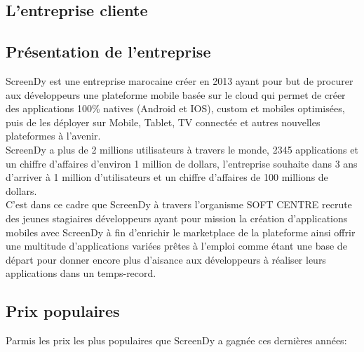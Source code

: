 \documentclass[12pt,a4paper]{report}
\begin{document}
	\subsection{L'entreprise cliente}
		\subsection{Présentation de l'entreprise}
ScreenDy est une entreprise marocaine créer en 2013 ayant pour but de procurer aux développeurs une plateforme mobile basée sur le cloud qui permet de créer des applications 100\% natives (Android et IOS), custom et mobiles optimisées, puis de les déployer sur Mobile, Tablet, TV connectée et autres nouvelles plateformes à l'avenir.\\
ScreenDy a plus de 2 millions utilisateurs à travers le monde, 2345 applications et un chiffre d'affaires d'environ 1 million de dollars, l'entreprise souhaite dans 3 ans d'arriver à 1 million d'utilisateurs et un chiffre d'affaires de 100 millions de dollars.\\
C'est dans ce cadre que ScreenDy à travers l'organisme SOFT CENTRE recrute des jeunes stagiaires développeurs ayant pour mission la création d'applications mobiles avec ScreenDy à fin d'enrichir le \guillemotleft marketplace \guillemotright de la plateforme ainsi offrir une multitude d'applications variées prêtes à l'emploi comme étant une base de départ pour donner encore plus d'aisance aux développeurs à réaliser leurs applications dans un temps-record.
		\subsection{Prix populaires}
Parmis les prix les plus populaires que ScreenDy a gagnée ces dernières années:\\
\end{document}
